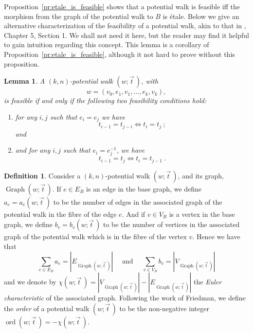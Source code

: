 \documentclass{memo-l}
\theoremstyle{plain}
\theoremstyle{definition}
\numberwithin{section}{chapter}
\numberwithin{equation}{chapter}
\DeclareMathOperator{\ord}{ord}
\DeclareMathOperator{\Graph}{Graph}
\newcommand{\potwalk}{(w;\vec t\,)}
\theoremstyle{plain}
\newtheorem{lem}[theorem]{Lemma}
\theoremstyle{definition}
\newtheorem{defn}[theorem]{Definition}
\newcommand\cC{\mathcal{C}}
\begin{document}
Proposition~\ref{pr:etale_is_feasible} shows that a potential walk
is feasible iff the morphism from the graph of the potential walk to
$B$ is \'etale.  Below we give an alternative characterization 
of the feasibility of a potential walk, akin
to that in \cite{friedman_alon}, Chapter 5, Section 1.  We shall
not need it here, but the reader may find it helpful to gain intuition
regarding this concept.  This lemma is a corollary of
Proposition~\ref{pr:etale_is_feasible}, although it not hard to 
prove without this proposition.

\begin{lem} A $(k,n)$-potential walk \( \potwalk \), with
$$
w=(v_0,e_1,v_1,\ldots,e_k,v_k),
$$
is feasible if and
only if the following two feasibility conditions hold:
\begin{enumerate}[label= (\arabic*)] \item for any \( i, j \) such that 
$e_i=e_j$
we have \[ t_{i-1} = t_{j-i} \iff t_i = t_j \ ;
\] 
and
\item and for any \( i,j \) such that 
$e_i = e_j^{-1}$,
we have \[ t_{i-1} = t_j \iff t_i = t_{j-1}\ . \]
\end{enumerate} \end{lem}

\begin{defn}\label{defn_associated_graph}
Consider a $(k,n)$-potential walk \( \potwalk \),
and its graph, $\Graph\potwalk$. 
If \( e \in E_B \) is an edge in the base graph, we define \( a_e
= a_e \potwalk \) to be the number of edges in the associated graph of the
potential walk in the fibre of the edge \(e\). And if \( v \in V_B \) is a
vertex in the base graph, we define \(b_v = b_v\potwalk \) to be the number
of vertices in the associated graph of the potential walk which is in the
fibre of the vertex \(v\). Hence we have that \[ \sum_{e \in E_B}a_e =
|E_{\Graph\potwalk}| \quad\text{ and }\quad \sum_{v \in V_B}b_v =
|V_{\Graph\potwalk}| \] and we denote by \( \chi\potwalk =
|V_{\Graph\potwalk}| - |E_{\Graph\potwalk}| \) the \emph{Euler
characteristic} of the associated graph. Following the work of Friedman, we
define the \emph{order} of a potential walk \( \potwalk \) to be the
non-negative integer \( \ord\potwalk = - \chi\potwalk \).
\end{defn}
\end{document}
